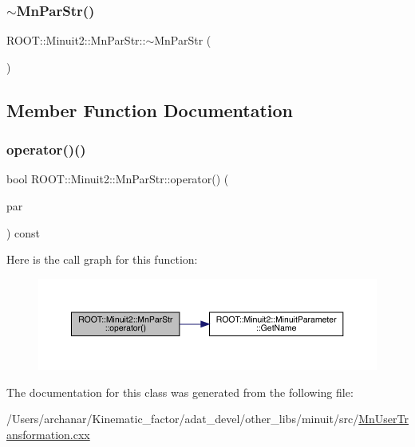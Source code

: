 \subsubsection{\texorpdfstring{$\sim$MnParStr()}{~MnParStr()}}
{\footnotesize\ttfamily R\+O\+O\+T\+::\+Minuit2\+::\+Mn\+Par\+Str\+::$\sim$\+Mn\+Par\+Str (\begin{DoxyParamCaption}{ }\end{DoxyParamCaption})\hspace{0.3cm}{\ttfamily [inline]}}



\subsection{Member Function Documentation}
\mbox{\label{classROOT_1_1Minuit2_1_1MnParStr_a34637805bbe12052e26f2eab37d23ff1}} 
\subsubsection{\texorpdfstring{operator()()}{operator()()}}
{\footnotesize\ttfamily bool R\+O\+O\+T\+::\+Minuit2\+::\+Mn\+Par\+Str\+::operator() (\begin{DoxyParamCaption}\item[{const \mbox{\hyperlink{classROOT_1_1Minuit2_1_1MinuitParameter}{Minuit\+Parameter}} \&}]{par }\end{DoxyParamCaption}) const\hspace{0.3cm}{\ttfamily [inline]}}

Here is the call graph for this function\+:\nopagebreak
\begin{figure}[H]
\begin{center}
\leavevmode
\includegraphics[width=350pt]{d7/df5/classROOT_1_1Minuit2_1_1MnParStr_a34637805bbe12052e26f2eab37d23ff1_cgraph}
\end{center}
\end{figure}


The documentation for this class was generated from the following file\+:\begin{DoxyCompactItemize}
\item 
/\+Users/archanar/\+Kinematic\+\_\+factor/adat\+\_\+devel/other\+\_\+libs/minuit/src/\mbox{\hyperlink{MnUserTransformation_8cxx}{Mn\+User\+Transformation.\+cxx}}\end{DoxyCompactItemize}
